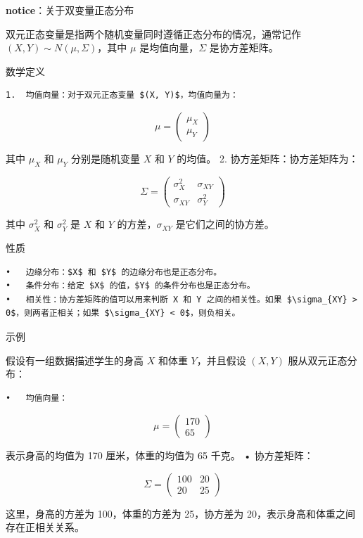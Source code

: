 \documentclass[
  letterpaper,
  DIV=11,
  numbers=noendperiod]{scrartcl}
\begin{document}
\textbf{notice}：关于双变量正态分布

双元正态变量是指两个随机变量同时遵循正态分布的情况，通常记作
\((X, Y) \sim N(\mu, \Sigma)\)，其中 \(\mu\) 是均值向量，\(\Sigma\)
是协方差矩阵。

数学定义

\begin{verbatim}
1.  均值向量：对于双元正态变量 $(X, Y)$，均值向量为：
\end{verbatim}

\[\mu = \begin{pmatrix}
\mu_X \\
\mu_Y
\end{pmatrix}\]

其中 \(\mu_X\) 和 \(\mu_Y\) 分别是随机变量 \(X\) 和 \(Y\) 的均值。 2.
协方差矩阵：协方差矩阵为：

\[\Sigma = \begin{pmatrix}
\sigma_X^2 & \sigma_{XY} \\
\sigma_{XY} & \sigma_Y^2
\end{pmatrix}\]

其中 \(\sigma_X^2\) 和 \(\sigma_Y^2\) 是 \(X\) 和 \(Y\)
的方差，\(\sigma_{XY}\) 是它们之间的协方差。

性质

\begin{verbatim}
•   边缘分布：$X$ 和 $Y$ 的边缘分布也是正态分布。
•   条件分布：给定 $X$ 的值，$Y$ 的条件分布也是正态分布。
•   相关性：协方差矩阵的值可以用来判断 X 和 Y 之间的相关性。如果 $\sigma_{XY} > 0$，则两者正相关；如果 $\sigma_{XY} < 0$，则负相关。
\end{verbatim}

示例

假设有一组数据描述学生的身高 \(X\) 和体重 \(Y\)，并且假设 \((X, Y)\)
服从双元正态分布：

\begin{verbatim}
•   均值向量：
\end{verbatim}

\[\mu = \begin{pmatrix}
170 \\
65
\end{pmatrix}\]

表示身高的均值为 170 厘米，体重的均值为 65 千克。 • 协方差矩阵：

\[\Sigma = \begin{pmatrix}
100 & 20 \\
20 & 25
\end{pmatrix}\]

这里，身高的方差为 100，体重的方差为 25，协方差为
20，表示身高和体重之间存在正相关关系。
\end{document}
